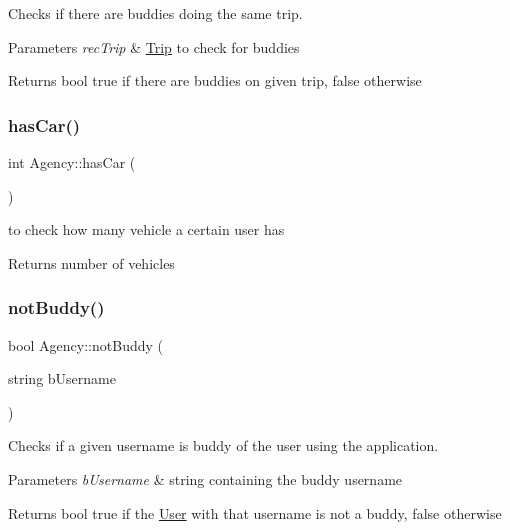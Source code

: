 Checks if there are buddies doing the same trip. 


\begin{DoxyParams}{Parameters}
{\em rec\+Trip} & \hyperlink{class_trip}{Trip} to check for buddies\\
\hline
\end{DoxyParams}
\begin{DoxyReturn}{Returns}
bool true if there are buddies on given trip, false otherwise 
\end{DoxyReturn}
\mbox{\label{class_agency_a7b37fecbc7cf1524b841ac82be7a7d29}} 
\subsubsection{\texorpdfstring{has\+Car()}{hasCar()}}
{\footnotesize\ttfamily int Agency\+::has\+Car (\begin{DoxyParamCaption}{ }\end{DoxyParamCaption})}



to check how many vehicle a certain user has 

\begin{DoxyReturn}{Returns}
number of vehicles 
\end{DoxyReturn}
\mbox{\label{class_agency_a9cbd4d4f5f20f6ec9e3d3088cf61f96a}} 
\subsubsection{\texorpdfstring{not\+Buddy()}{notBuddy()}}
{\footnotesize\ttfamily bool Agency\+::not\+Buddy (\begin{DoxyParamCaption}\item[{string}]{b\+Username }\end{DoxyParamCaption})}



Checks if a given username is buddy of the user using the application. 


\begin{DoxyParams}{Parameters}
{\em b\+Username} & string containing the buddy username\\
\hline
\end{DoxyParams}
\begin{DoxyReturn}{Returns}
bool true if the \hyperlink{class_user}{User} with that username is not a buddy, false otherwise 
\end{DoxyReturn}
\mbox{\label{class_agency_a76d5990291e33a194a46c390986a668b}} 
